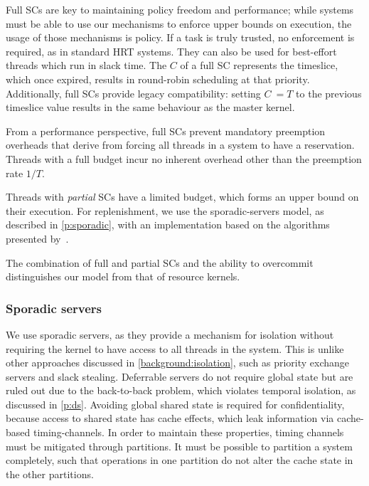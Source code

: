 Full \glspl{SC} are key to maintaining policy freedom and performance; while systems
must be able to use our mechanisms to enforce upper bounds on execution, the usage of 
those mechanisms is policy. If a task is truly trusted, no enforcement is required,
as in standard \gls{HRT} systems. They can also be used for best-effort threads which run in slack time.
The \(C\) of a full \gls{SC} represents the timeslice, which once expired, results in round-robin
scheduling at that priority. Additionally, full \glspl{SC} provide legacy compatibility: setting
\(C\ = T\) to
the previous timeslice value results in the same behaviour as the master kernel. 

From a performance perspective, full \glspl{SC} prevent mandatory preemption overheads 
that derive from forcing all threads in a system to have a reservation. Threads with a full
budget incur no inherent overhead other than the preemption rate $1/T$.

Threads with \emph{partial} \glspl{SC} have a limited budget, which forms an upper
bound on their execution. For replenishment, we
use the sporadic-servers model, as described in \cref{p:sporadic}, with an
implementation based on the algorithms presented
by~\citet{Stanovic_BWH_10}. 

The combination of full and partial \glspl{SC}  and the ability to overcommit distinguishes our
model from that of resource kernels.

\subsubsection{Sporadic servers}
\label{sec:model-sporadic}

We use sporadic servers, as they provide a mechanism for isolation without requiring the kernel
to have access to all threads in the system. This is unlike other approaches discussed in
\cref{background:isolation}, such as  priority exchange servers and slack stealing.
Deferrable servers do not require global state but are ruled out due to the back-to-back
problem, which violates temporal isolation, as discussed in \cref{p:ds}. Avoiding global shared state is required for confidentiality, because access to shared state
has cache effects, which leak information via cache-based timing-channels. In order to maintain these properties,
timing channels must be mitigated through partitions. 
It must be possible to partition a system completely, such that operations in one partition do not
alter the cache state in the other partitions.

